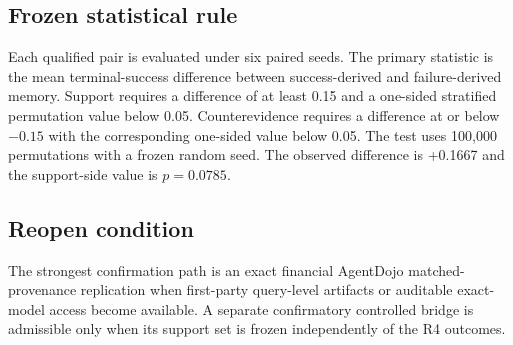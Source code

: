 \subsection{Frozen statistical rule}
Each qualified pair is evaluated under six paired seeds. The primary statistic is the mean terminal-success difference between success-derived and failure-derived memory. Support requires a difference of at least 0.15 and a one-sided stratified permutation value below 0.05. Counterevidence requires a difference at or below $-0.15$ with the corresponding one-sided value below 0.05. The test uses 100,000 permutations with a frozen random seed. The observed difference is +0.1667 and the support-side value is $p=0.0785$.

\subsection{Reopen condition}
The strongest confirmation path is an exact financial AgentDojo matched-provenance replication when first-party query-level artifacts or auditable exact-model access become available. A separate confirmatory controlled bridge is admissible only when its support set is frozen independently of the R4 outcomes.
